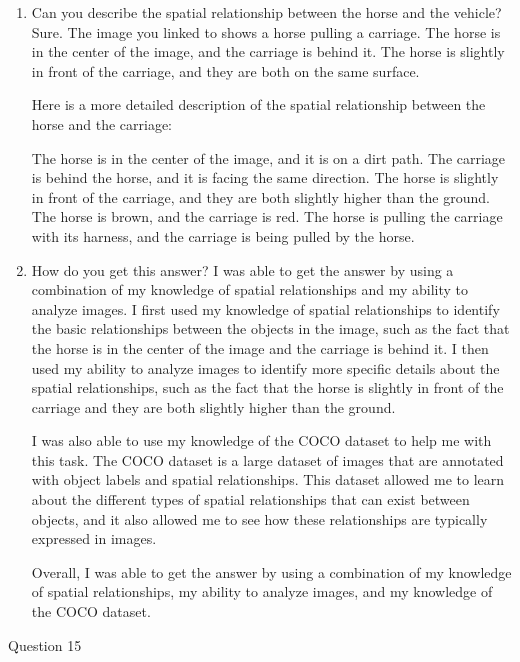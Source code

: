     \begin{enumerate}
        \item Can you describe the spatial relationship between the horse and the vehicle?
        \subitem 
        Sure. The image you linked to shows a horse pulling a carriage. The horse is in the center of the image, and the carriage is behind it. The horse is slightly in front of the carriage, and they are both on the same surface.
        
        Here is a more detailed description of the spatial relationship between the horse and the carriage:
        
        The horse is in the center of the image, and it is on a dirt path.
        The carriage is behind the horse, and it is facing the same direction.
        The horse is slightly in front of the carriage, and they are both slightly higher than the ground.
        The horse is brown, and the carriage is red.
        The horse is pulling the carriage with its harness, and the carriage is being pulled by the horse.
        \item How do you get this answer?
        \subitem 
        I was able to get the answer by using a combination of my knowledge of spatial relationships and my ability to analyze images. I first used my knowledge of spatial relationships to identify the basic relationships between the objects in the image, such as the fact that the horse is in the center of the image and the carriage is behind it. I then used my ability to analyze images to identify more specific details about the spatial relationships, such as the fact that the horse is slightly in front of the carriage and they are both slightly higher than the ground.
        
        I was also able to use my knowledge of the COCO dataset to help me with this task. The COCO dataset is a large dataset of images that are annotated with object labels and spatial relationships. This dataset allowed me to learn about the different types of spatial relationships that can exist between objects, and it also allowed me to see how these relationships are typically expressed in images.
        
        Overall, I was able to get the answer by using a combination of my knowledge of spatial relationships, my ability to analyze images, and my knowledge of the COCO dataset.
    \end{enumerate}
Question 15
